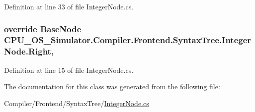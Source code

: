 Definition at line 33 of file Integer\+Node.\+cs.

\hypertarget{class_c_p_u___o_s___simulator_1_1_compiler_1_1_frontend_1_1_syntax_tree_1_1_integer_node_a34f082eb9ebfa34ef854fdfef4ae4f65}{}
\subsubsection[{Right}]{\setlength{\rightskip}{0pt plus 5cm}override {\bf Base\+Node} C\+P\+U\+\_\+\+O\+S\+\_\+\+Simulator.\+Compiler.\+Frontend.\+Syntax\+Tree.\+Integer\+Node.\+Right\hspace{0.3cm}{\ttfamily [get]}, {\ttfamily [set]}}\label{class_c_p_u___o_s___simulator_1_1_compiler_1_1_frontend_1_1_syntax_tree_1_1_integer_node_a34f082eb9ebfa34ef854fdfef4ae4f65}


Definition at line 15 of file Integer\+Node.\+cs.



The documentation for this class was generated from the following file\+:\begin{DoxyCompactItemize}
\item 
Compiler/\+Frontend/\+Syntax\+Tree/\hyperlink{_integer_node_8cs}{Integer\+Node.\+cs}\end{DoxyCompactItemize}
